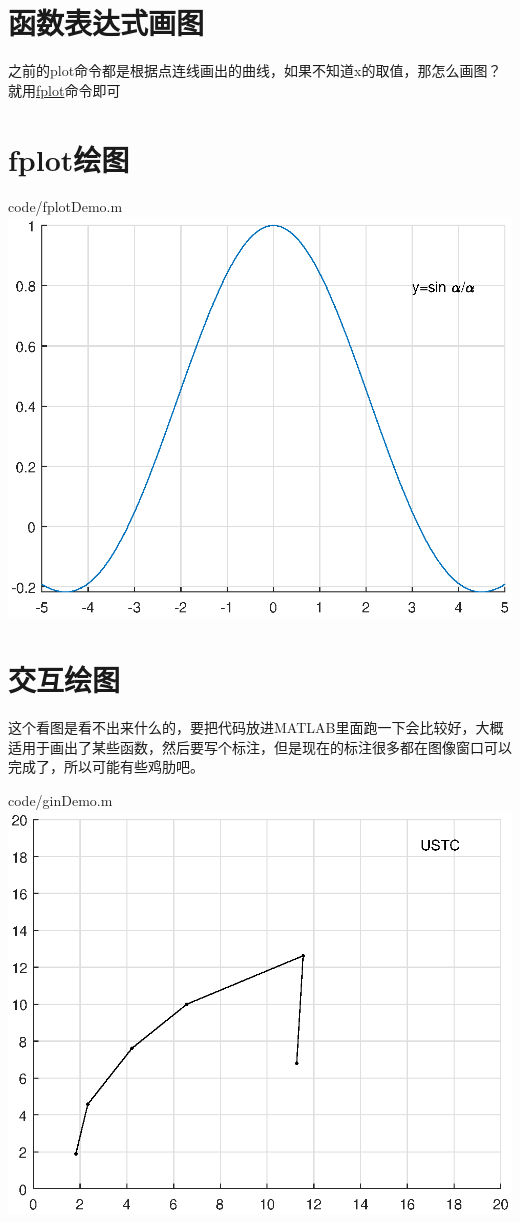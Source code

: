 \documentclass{hfutpaper}
\makeatletter
\newcommand{\figcaption}{\def\@captype{figure}\caption}
\makeatother
\begin{document}
\section{函数表达式画图}
之前的plot命令都是根据点连线画出的曲线，如果不知道x的取值，那怎么画图？就用\underline{fplot}命令即可
\section*{fplot绘图}

{code/fplotDemo.m}
\includegraphics{figure/textAndFplot.eps}
\figcaption{text打标记和fplot画图}
\section*{交互绘图}
这个看图是看不出来什么的，要把代码放进MATLAB里面跑一下会比较好，大概适用于画出了某些函数，然后要写个标注，但是现在的标注很多都在图像窗口可以完成了，所以可能有些鸡肋吧。

{code/ginDemo.m}
\includegraphics{figure/gin.eps}
\figcaption{交互绘图}
\end{document}
